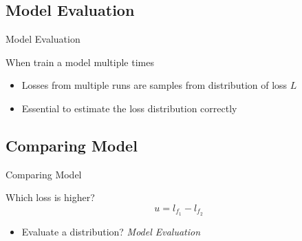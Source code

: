 \subsection{Model Evaluation}

\begin{frame}{Model Evaluation}

When train a model multiple times

\begin{itemize}
    \item Losses from multiple runs are samples from distribution of loss $L$
    \item Essential to estimate the loss distribution correctly
\end{itemize}

\end{frame}

\subsection{Comparing Model}

\begin{frame}{Comparing Model}
\begin{exampleblock}{Which loss is higher?}
\begin{equation}
    u = l_{f_1} - l_{f_2}
\end{equation}
\end{exampleblock}

\begin{itemize}
    \item Evaluate a distribution? \emph{Model Evaluation}
\end{itemize}

\end{frame}